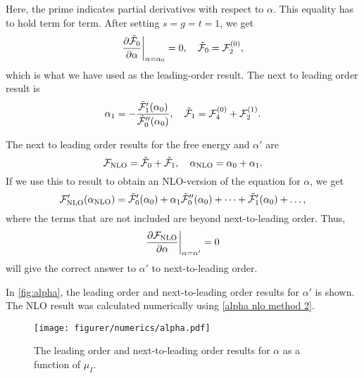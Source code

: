 Here, the prime indicates partial derivatives with respect to $\alpha$.
This equality has to hold term for term.
After setting $s = g = t = 1$, we get
\begin{align*}
    \diffp{\tilde \Ef_0}{\alpha}\bigg|_{\alpha=\alpha_0} = 0, \quad
    \tilde \Ef_0 = \Ef_2^{(0)},
\end{align*}
which is what we have used as the leading-order result. 
The next to leading order result is
\begin{equation}
    \alpha_1 = - \frac{\tilde {\mathcal{F}}_1'(\alpha_0)}{{\tilde {\mathcal{F}}_0''(\alpha_0)}},
    \quad 
    \tilde {\mathcal{F}}_1 = \mathcal{F}_{4}^{(0)} + \mathcal{F}_{2}^{(1)}.
\end{equation}

The next to leading order results for the free energy and $\alpha'$ are
\begin{equation}
    \mathcal{F}_\mathrm{NLO} = \tilde {\mathcal{F}}_0 + \tilde {\mathcal{F}}_1, \quad
    \alpha_\mathrm{NLO} = \alpha_0 + \alpha_1.
\end{equation}
If we use this to result to obtain an NLO-version of the equation for $\alpha$, we get
\begin{equation}
    \mathcal{F}_\mathrm{NLO}'(\alpha_\mathrm{NLO})
    = \tilde {\mathcal{F}}_0'(\alpha_0) + \alpha_1 \tilde {\mathcal{F}}_0''(\alpha_0) + \dots
    + \tilde {\mathcal{F}}_1'(\alpha_0) + \dots,
\end{equation}
where the terms that are not included are beyond next-to-leading order.
Thus,
\begin{equation}
    \label{alpha nlo method 2}
    \diffp{\Ef_\mathrm{NLO}}{\alpha} \bigg|_{\alpha=\alpha'} = 0
\end{equation}
will give the correct answer to $\alpha'$ to next-to-leading order.

In \autoref{fig:alpha}, the leading order and next-to-leading order results for $\alpha'$ is shown.
The NLO result was calculated numerically using \cref{alpha nlo method 2}.
\begin{figure}
    \centering
    \texttt{[image: figurer/numerics/alpha.pdf]}
    \caption{The leading order and next-to-leading order results for $\alpha$ as a function of $\mu_I$.}
    \label{fig:alpha}
\end{figure}
